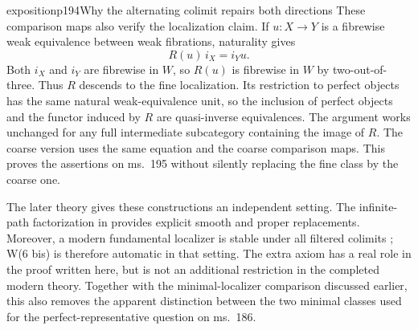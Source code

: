 \begin{dcomment}{exposition}{p194}{Why the alternating colimit repairs both directions}
These comparison maps also verify the localization claim. If $u:X\to Y$ is a fibrewise weak equivalence between weak fibrations, naturality gives
\[
R(u)\,i_X=i_Yu.
\]
Both $i_X$ and $i_Y$ are fibrewise in $W$, so $R(u)$ is fibrewise in $W$ by two-out-of-three. Thus $R$ descends to the fine localization. Its restriction to perfect objects has the same natural weak-equivalence unit, so the inclusion of perfect objects and the functor induced by $R$ are quasi-inverse equivalences. The argument works unchanged for any full intermediate subcategory containing the image of $R$. The coarse version uses the same equation and the coarse comparison maps. This proves the assertions on ms.~195 without silently replacing the fine class by the coarse one.

The later theory gives these constructions an independent setting. The infinite-path factorization in \citet[Sections~3.2.40--3.2.45]{Maltsiniotis2020} provides explicit smooth and proper replacements. Moreover, a modern fundamental localizer is stable under all filtered colimits \citep[Corollary~4.2.22]{Cisinski2006}; W(6 bis) is therefore automatic in that setting. The extra axiom has a real role in the proof written here, but is not an additional restriction in the completed modern theory. Together with the minimal-localizer comparison discussed earlier, this also removes the apparent distinction between the two minimal classes used for the perfect-representative question on ms.~186.
\end{dcomment}

